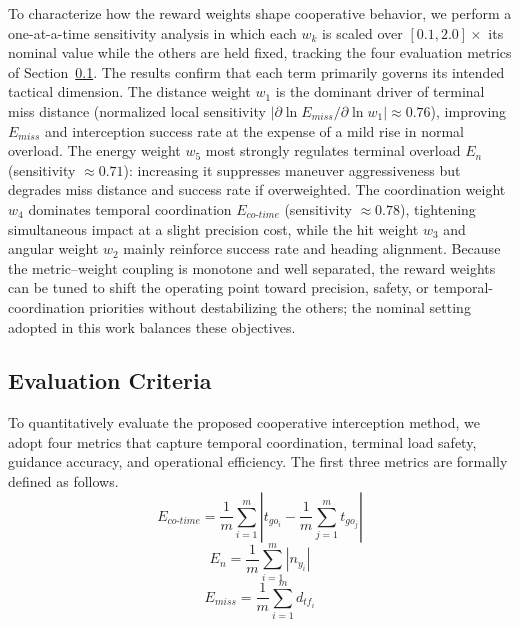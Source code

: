 \documentclass[lettersize,journal]{IEEEtran}
\newcommand{\hladd}[1]{{\color{blue}#1}}
\begin{document}
\hladd{To characterize how the reward weights shape cooperative behavior, we perform a one-at-a-time sensitivity analysis in which each $w_k$ is scaled over $[0.1,2.0]\times$ its nominal value while the others are held fixed, tracking the four evaluation metrics of Section~\ref{subsec:eval}. The results confirm that each term primarily governs its intended tactical dimension. The distance weight $w_1$ is the dominant driver of terminal miss distance (normalized local sensitivity $|\partial \ln E_{miss}/\partial \ln w_1| \approx 0.76$), improving $E_{miss}$ and interception success rate at the expense of a mild rise in normal overload. The energy weight $w_5$ most strongly regulates terminal overload $E_n$ (sensitivity $\approx 0.71$): increasing it suppresses maneuver aggressiveness but degrades miss distance and success rate if overweighted. The coordination weight $w_4$ dominates temporal coordination $E_{co\text{-}time}$ (sensitivity $\approx 0.78$), tightening simultaneous impact at a slight precision cost, while the hit weight $w_3$ and angular weight $w_2$ mainly reinforce success rate and heading alignment. Because the metric--weight coupling is monotone and well separated, the reward weights can be tuned to shift the operating point toward precision, safety, or temporal-coordination priorities without destabilizing the others; the nominal setting adopted in this work balances these objectives.}

\subsection{Evaluation Criteria}
\label{subsec:eval}

To quantitatively evaluate the proposed cooperative interception method, we adopt four metrics that capture temporal coordination, terminal load safety, guidance accuracy, and operational efficiency. The first three metrics are formally defined as follows.
\begin{equation}
\label{E1}
E_{co\text{-}time} = \frac{1}{m}\sum_{i=1}^{m} \left| t_{go_i} - \frac{1}{m}\sum_{j=1}^{m} t_{go_j} \right|
\end{equation}
\begin{equation}
\label{E2}
E_{n} = \frac{1}{m}\sum_{i=1}^{m} |n_{y_i}|
\end{equation}
\begin{equation}
\label{E3}
E_{miss} = \frac{1}{m}\sum_{i=1}^{m} d_{tf_i}
\end{equation}
\end{document}
